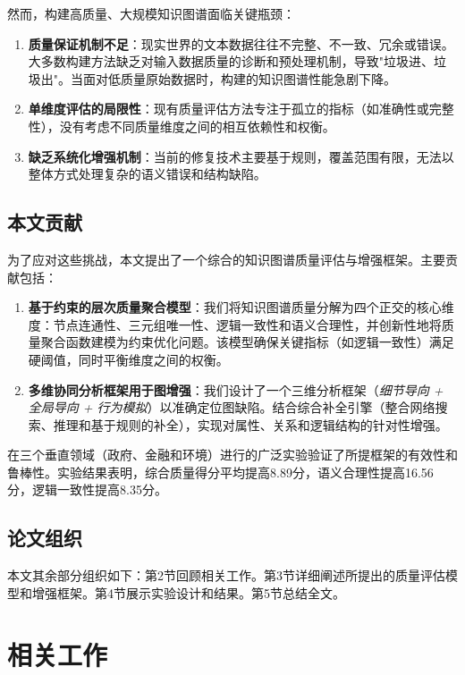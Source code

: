 \documentclass[runningheads]{llncs}
\begin{document}
然而，构建高质量、大规模知识图谱面临关键瓶颈：

\begin{enumerate}
    \item \textbf{质量保证机制不足}：现实世界的文本数据往往不完整、不一致、冗余或错误。大多数构建方法缺乏对输入数据质量的诊断和预处理机制，导致"垃圾进、垃圾出"。当面对低质量原始数据时，构建的知识图谱性能急剧下降。
    \item \textbf{单维度评估的局限性}：现有质量评估方法专注于孤立的指标（如准确性或完整性），没有考虑不同质量维度之间的相互依赖性和权衡。
    \item \textbf{缺乏系统化增强机制}：当前的修复技术主要基于规则，覆盖范围有限，无法以整体方式处理复杂的语义错误和结构缺陷。
\end{enumerate}

\subsection{本文贡献}
为了应对这些挑战，本文提出了一个综合的知识图谱质量评估与增强框架。主要贡献包括：

\begin{enumerate}
    \item \textbf{基于约束的层次质量聚合模型}：我们将知识图谱质量分解为四个正交的核心维度：节点连通性、三元组唯一性、逻辑一致性和语义合理性，并创新性地将质量聚合函数建模为约束优化问题。该模型确保关键指标（如逻辑一致性）满足硬阈值，同时平衡维度之间的权衡。
    \item \textbf{多维协同分析框架用于图增强}：我们设计了一个三维分析框架（\textit{细节导向 + 全局导向 + 行为模拟}）以准确定位图缺陷。结合综合补全引擎（整合网络搜索、推理和基于规则的补全），实现对属性、关系和逻辑结构的针对性增强。
\end{enumerate}

在三个垂直领域（政府、金融和环境）进行的广泛实验验证了所提框架的有效性和鲁棒性。实验结果表明，综合质量得分平均提高8.89分，语义合理性提高16.56分，逻辑一致性提高8.35分。

\subsection{论文组织}
本文其余部分组织如下：第2节回顾相关工作。第3节详细阐述所提出的质量评估模型和增强框架。第4节展示实验设计和结果。第5节总结全文。

\section{相关工作}
\label{sec:related_work}
\end{document}
